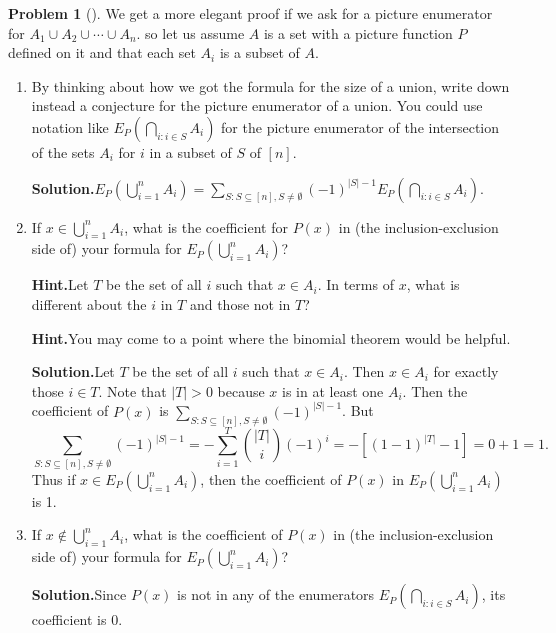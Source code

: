 \documentclass[10pt,]{book}
\theoremstyle{plain}
\theoremstyle{definition}
\newtheorem{activity}[project]{Problem}
\theoremstyle{definition}
\numberwithin{equation}{chapter}
\newcommand{\gt}{>}
\begin{document}
\begin{activity}[]\label{activity-233}
We get a more elegant proof if we ask for a picture enumerator for \(A_1 \cup A_2 \cup \cdots \cup A_n\).  so let us assume \(A\) is a set with a picture function \(P\) defined on it and that each set \(A_i\) is a subset of \(A\).%
\begin{enumerate}[font=\bfseries,label=(\alph*),ref=\alph*]
\item\label{task-169} By thinking about how we got the formula for the size of a union, write down instead a conjecture for the picture enumerator of a union.  You could use notation like \(E_P(\bigcap_{i:i\in S} A_i)\) for the picture enumerator of the intersection of the sets \(A_i\) for \(i\) in a subset of \(S\) of \([n]\).%
\par\medskip\noindent%
\textbf{Solution.}\quad \(E_P(\bigcup_{i=1}^n A_i) =  \sum_{S:S\subseteq[n],S\ne\emptyset} (-1)^{|S|-1}E_P(\bigcap_{i:i\in S}A_i)\).%
\item\label{task-170} If \(x \in \bigcup_{i=1}^n A_i\), what is the coefficient for \(P(x)\) in (the inclusion-exclusion side of) your formula for \(E_P(\bigcup_{i=1}^n A_i)\)?%
\par\medskip\noindent%
\textbf{Hint.}\quad Let \(T\) be the set of all \(i\) such that \(x \in A_i\). In terms of \(x\), what is different about the \(i\) in \(T\) and those not in \(T\)?%
\par\medskip\noindent%
\textbf{Hint.}\quad You may come to a point where the binomial theorem would be helpful.%
\par\medskip\noindent%
\textbf{Solution.}\quad Let \(T\) be the set of all \(i\) such that \(x\in A_i\).  Then \(x \in A_i\) for exactly those \(i \in T\).  Note that \(|T| \gt 0\) because \(x\) is in at least one \(A_i\).  Then the coefficient of \(P(x)\) is \(\sum_{S:S\subseteq[n],S\ne\emptyset} (-1)^{|S|-1}\).  But%
\begin{equation*}
\sum_{S:S\subseteq[n],S\ne\emptyset} (-1)^{|S|-1} = -\sum_{i=1}^T\binom{|T|}{i}(-1)^i = -[(1-1)^{|T|} - 1] = 0+1 = 1.
\end{equation*}
Thus if \(x \in E_P(\bigcup_{i=1}^n A_i)\), then the coefficient of \(P(x)\) in \(E_P(\bigcup_{i=1}^n A_i)\) is 1.%
\item\label{task-171} If \(x \notin \bigcup_{i=1}^n A_i\), what is the coefficient of \(P(x)\) in (the inclusion-exclusion side of) your formula for \(E_P(\bigcup_{i=1}^n A_i)\)?%
\par\medskip\noindent%
\textbf{Solution.}\quad Since \(P(x)\) is not in any of the enumerators \(E_P(\bigcap_{i:i\in S} A_i)\), its coefficient is 0.%

\end{enumerate}
\end{activity}
\end{document}
